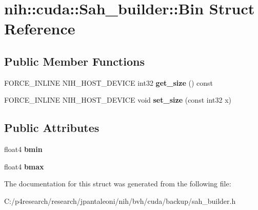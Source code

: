 \hypertarget{structnih_1_1cuda_1_1_sah__builder_1_1_bin}{
\section{nih\-:\-:cuda\-:\-:\-Sah\-\_\-builder\-:\-:\-Bin \-Struct \-Reference}
\label{structnih_1_1cuda_1_1_sah__builder_1_1_bin}
}
\subsection*{\-Public \-Member \-Functions}
\begin{DoxyCompactItemize}
\item 
\hypertarget{structnih_1_1cuda_1_1_sah__builder_1_1_bin_a07e4e088ff4f4fd6a36754a503c8a189}{
\-F\-O\-R\-C\-E\-\_\-\-I\-N\-L\-I\-N\-E \-N\-I\-H\-\_\-\-H\-O\-S\-T\-\_\-\-D\-E\-V\-I\-C\-E int32 {\bfseries get\-\_\-size} () const }
\label{structnih_1_1cuda_1_1_sah__builder_1_1_bin_a07e4e088ff4f4fd6a36754a503c8a189}

\item 
\hypertarget{structnih_1_1cuda_1_1_sah__builder_1_1_bin_a8e1d01524a40f8215001e619a54153bb}{
\-F\-O\-R\-C\-E\-\_\-\-I\-N\-L\-I\-N\-E \-N\-I\-H\-\_\-\-H\-O\-S\-T\-\_\-\-D\-E\-V\-I\-C\-E void {\bfseries set\-\_\-size} (const int32 x)}
\label{structnih_1_1cuda_1_1_sah__builder_1_1_bin_a8e1d01524a40f8215001e619a54153bb}

\end{DoxyCompactItemize}
\subsection*{\-Public \-Attributes}
\begin{DoxyCompactItemize}
\item 
\hypertarget{structnih_1_1cuda_1_1_sah__builder_1_1_bin_a50945de37389ef840eb7bbefb57b0d40}{
float4 {\bfseries bmin}}
\label{structnih_1_1cuda_1_1_sah__builder_1_1_bin_a50945de37389ef840eb7bbefb57b0d40}

\item 
\hypertarget{structnih_1_1cuda_1_1_sah__builder_1_1_bin_a47205ffafe0ef53051ede1d452e6a7d9}{
float4 {\bfseries bmax}}
\label{structnih_1_1cuda_1_1_sah__builder_1_1_bin_a47205ffafe0ef53051ede1d452e6a7d9}

\end{DoxyCompactItemize}


\-The documentation for this struct was generated from the following file\-:\begin{DoxyCompactItemize}
\item 
\-C\-:/p4research/research/jpantaleoni/nih/bvh/cuda/backup/sah\-\_\-builder.\-h\end{DoxyCompactItemize}
